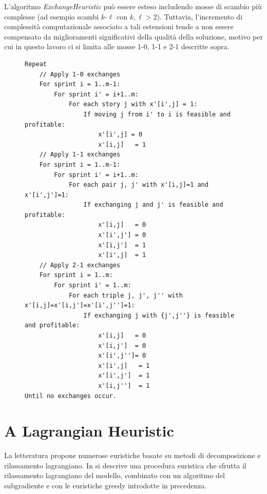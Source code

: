 \documentclass[12pt,a4paper,openright,twoside]{book}
\begin{document}
L'algoritmo {\em ExchangeHeuristic} può essere esteso includendo mosse di scambio più complesse (ad esempio scambi $k$-$\ell$ con $k,\ell > 2$). Tuttavia, l'incremento di complessità computazionale associato a tali estensioni tende a non essere compensato da miglioramenti significativi della qualità della soluzione, motivo per cui in questo lavoro ci si limita alle mosse 1-0, 1-1 e 2-1 descritte sopra.

\begin{figure}[H]
\begin{lstlisting}[style=pseudo, caption={ExchangeHeuristic},label={Alg.EH}]
Repeat
    // Apply 1-0 exchanges
    For sprint i = 1..m-1:
        For sprint i' = i+1..m:
            For each story j with x'[i',j] = 1:
                If moving j from i' to i is feasible and profitable:
                    x'[i',j] = 0
                    x'[i,j]   = 1
    // Apply 1-1 exchanges
    For sprint i = 1..m-1:
        For sprint i' = i+1..m:
            For each pair j, j' with x'[i,j]=1 and x'[i',j']=1:
                If exchanging j and j' is feasible and profitable:
                    x'[i,j]   = 0
                    x'[i',j'] = 0
                    x'[i,j']  = 1
                    x'[i',j]  = 1
    // Apply 2-1 exchanges
    For sprint i = 1..m:
        For sprint i' = 1..m:
            For each triple j, j', j'' with x'[i,j]=x'[i,j']=x'[i',j'']=1:
                If exchanging j with {j',j''} is feasible and profitable:
                    x'[i,j]   = 0
                    x'[i,j']  = 0
                    x'[i',j'']= 0
                    x'[i',j]   = 1
                    x'[i',j']  = 1
                    x'[i,j'']  = 1
Until no exchanges occur.
\end{lstlisting}
\end{figure}


\section{A Lagrangian Heuristic}


La letteratura propone numerose euristiche basate su metodi di decomposizione e rilassamento lagrangiano. In \cite{BOSCHETTI2014116} si descrive una procedura euristica che sfrutta il rilassamento lagrangiano del modello, combinato con un algoritmo del subgradiente e con le euristiche greedy introdotte in precedenza.
\end{document}

